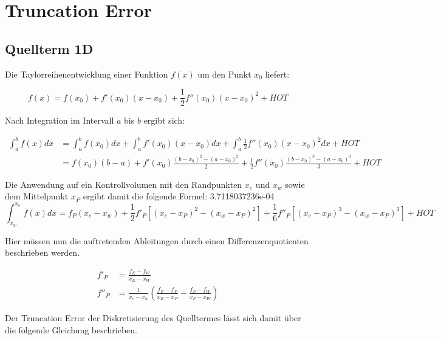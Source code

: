 \documentclass[11pt, ngerman,colorback,accentcolor=tud2d]{tudreport}
\begin{document}
\newcommand{\pder}[2][]{\frac{\partial#1}{\partial#2}}
\newcommand{\pderf}[1]{\frac{\partial f}{\partial#1}}
\newcommand{\pderfs}[1]{\frac{\partial^2 f}{\partial#1}}



\chapter{Truncation Error}
\label{cha:Truncation_Error}

\section{Quellterm 1D}
\label{sec:Quellterm}

Die Taylorreihenentwicklung einer Funktion $f(x)$ um den Punkt $x_0$
liefert:

\begin{equation*}
  f(x) = f(x_0) + f'(x_0)(x-x_0) + \frac{1}{2} f''(x_0)(x-x_0)^2 + HOT
\end{equation*}

Nach Integration im Intervall $a$ bis $b$ ergibt sich:

\begin{align*}
  \int_a^b f(x) dx &= \int_a^b f(x_0) dx + \int_a^b f'(x_0)(x-x_0) dx
+ \int_a^b \frac{1}{2} f''(x_0)(x-x_0)^2 dx + HOT\\
&= f(x_0) (b-a) + f'(x_0) \frac{(b-x_0)^2-(a-x_0)^2}{2}
+ \frac{1}{2} f''(x_0) \frac{(b-x_0)^3-(a-x_0)^3}{3} +HOT
\end{align*}

Die Anwendung auf ein Kontrollvolumen mit den Randpunkten $x_e$ und
$x_w$ sowie dem Mittelpunkt $x_P$ ergibt damit die folgende Formel:
3.7118037236e-04
\begin{equation*}
  \int_{x_w}^{x_e} f(x)dx = f_P(x_e-x_w)
+ \frac{1}{2} f'_P \left[{(x_e-x_P)^2-(x_w-x_P)^2}\right]
+ \frac{1}{6} f''_P \left[{{(x_e-x_P)}^3-{(x_w-x_P)}^3}\right] + HOT
\end{equation*}

Hier müssen nun die auftretenden Ableitungen durch einen Differenzenquotienten
beschrieben werden.

\begin{align*}
  f'_P &=\frac{f_E-f_W}{x_E-x_W} \\
  f''_P &= \frac{1}{x_e-x_w}\left(\frac{f_E-f_P}{x_E-x_P}-\frac{f_P-f_W}{x_P-x_W}\right)
\end{align*}

Der Truncation Error der Diskretisierung des Quelltermes lässt sich damit über die
folgende Gleichung beschrieben.
\end{document}
